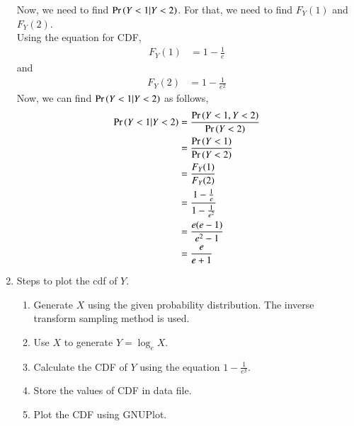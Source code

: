 \documentclass[journal,11pt]{IEEEtran}
\begin{document}
\begin{enumerate}
          Now, we need to find $\Pr\left(Y<1 | Y<2 \right)$.
          For that, we need to find $F_Y(1)$ and $F_Y(2)$.\\
          Using the equation for CDF,
          \begin{align}
              F_Y(1) & = 1 - \frac{1}{e}
          \end{align}
          and
          \begin{align}
              F_Y(2) & = 1 - \frac{1}{e^2}
          \end{align}
          Now, we can find $\Pr\left(Y<1 | Y<2 \right)$ as follows,
          \begin{align}
              \Pr\left(Y<1 | Y<2 \right) & = \frac{\Pr\left(Y<1 , Y<2\right)}{\Pr\left(Y<2\right)}           \\
                              & = \frac{\Pr\left(Y<1\right)}{\Pr\left(Y<2\right)}                 \\
                              & = \frac{F_Y(1)}{F_Y(2)}                     \\
                              & = \frac{1 - \frac{1}{e}}{1 - \frac{1}{e^2}} \\
                              & = \frac{e(e-1)}{e^2-1}                      \\
                              & = \frac{e}{e+1}
          \end{align}

    \item Steps to plot the cdf of $Y$.
          \begin{enumerate}
              \item Generate $X$ using the given probability distribution. The inverse transform sampling method is used.
              \item Use $X$ to generate $Y = \log_e X$.
              \item Calculate the CDF of $Y$ using the equation $1-\frac{1}{e^y}$.
              \item Store the values of CDF in data file.
              \item Plot the CDF using GNUPlot.
          \end{enumerate}
\end{enumerate}
\end{document}
